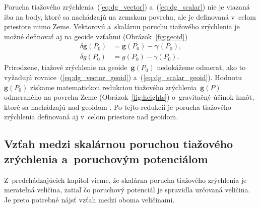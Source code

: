 \documentclass[a4paper, 12pt]{book}
\let\vec\mathbf
\begin{document}
Porucha tiažového zrýchlenia~(\ref{eq:dg_vector}) a~(\ref{eq:dg_scalar}) nie je 
viazaná iba na body, ktoré sa nachádzajú na zemskom povrchu, ale je definovaná 
v~celom priestore mimo Zeme.  Vektorovú a~skalárnu poruchu tiažového zrýchlenia 
je možné definovať aj na geoide vzťahmi (Obrázok~\ref{fig:geoid})
%
\begin{align}
\label{eq:dg_vector_geoid}
\delta \vec g(P_0) &= \vec g(P_0) - \boldsymbol \gamma(P_0){,}\\
%
\label{eq:dg_scalar_geoid}
\delta g(P_0) &= g(P_0) - \gamma(P_0){.}
\end{align}
%
Prirodzene, tiažové zrýchlenie na geoide~$\vec g(P_0)$ nedokážeme odmerať, ako 
to vyžadujú rovnice~(\ref{eq:dg_vector_geoid}) a~(\ref{eq:dg_scalar_geoid}).  
Hodnotu~$\vec g(P_0)$ získame matematickou redukciou tiažového zrýchlenia~$\vec 
g(P)$ odmeraného na povrchu Zeme (Obrázok~\ref{fig:heights}) o~gravitačný 
účinok hmôt, ktoré sa nachádzajú nad geoidom \parencite[pozri][]{Janak2006}.  
Po tejto redukcii je porucha tiažového zrýchlenia definovaná aj v~celom 
priestore nad geoidom.


\subsection{Vzťah medzi skalárnou poruchou tiažového zrýchlenia a~poruchovým 
potenciálom}

Z~predchádzajúcich kapitol vieme, že skalárna porucha tiažového zrýchlenia je 
merateľná veličina, zatiaľ čo poruchový potenciál je spravidla určovaná 
veličina.  Je preto potrebné nájsť vzťah medzi oboma veličinami.
\end{document}
